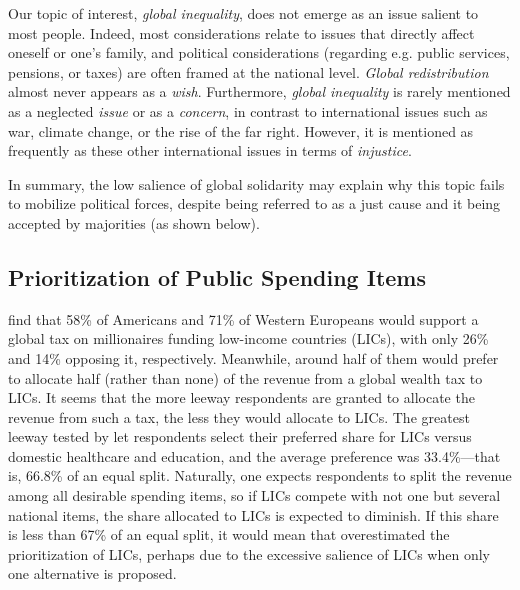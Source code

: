 \documentclass[12pt,english]{article}
\begin{document}
\begin{bibunit}
Our topic of interest, \textit{global inequality}, does not emerge as an issue salient to most people. Indeed, most considerations relate to issues that directly affect oneself or one's family, and political considerations (regarding e.g. public services, pensions, or taxes) are often framed at the national level. \textit{Global redistribution} almost never appears as a \textit{wish}. Furthermore, \textit{global inequality} is rarely mentioned as a neglected \textit{issue} or as a \textit{concern}, in contrast to international issues such as war, climate change, or the rise of the far right. However, it is mentioned as frequently as these other international issues in terms of \textit{injustice}.

In summary, the low salience of global solidarity may explain why this topic fails to mobilize political forces, despite being referred to as a just cause and it being accepted by majorities (as shown below).

\subsection{Prioritization of Public Spending Items}\label{subsec:revenue_split}

\cite{fabre_majority_2025} find that 58\% of Americans and 71\% of Western Europeans would support a global tax on millionaires funding low-income countries (LICs), with only 26\% and 14\% opposing it, respectively. Meanwhile, around half of them would prefer to allocate half (rather than none) of the revenue from a global wealth tax to LICs. 
It seems that the more leeway respondents are granted to allocate the revenue from such a tax, the less they would allocate to LICs. 
The greatest leeway tested by \cite{fabre_majority_2025} let respondents select their preferred share for LICs versus domestic healthcare and education, and the average preference was 33.4\%---that is, 66.8\% of an equal split.
Naturally, one expects respondents to split the revenue among all desirable spending items, so if LICs compete with not one but several national items, the share allocated to LICs is expected to diminish. If this share is less than 67\% of an equal split, it would mean that \cite{fabre_majority_2025} overestimated the prioritization of LICs, perhaps due to the excessive salience of LICs when only one alternative is proposed. 


\end{bibunit}
\end{document}
